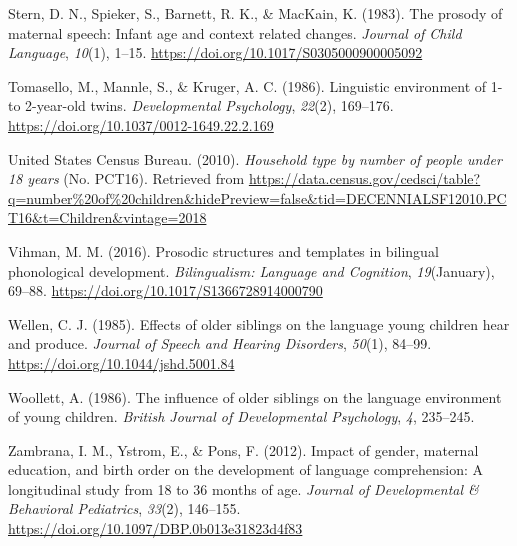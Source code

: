 \documentclass[man,floatsintext]{apa6}
\begin{document}
\leavevmode\hypertarget{ref-stern_prosody_1983}{}%
Stern, D. N., Spieker, S., Barnett, R. K., \& MacKain, K. (1983). The prosody of maternal speech: Infant age and context related changes. \emph{Journal of Child Language}, \emph{10}(1), 1--15. \url{https://doi.org/10.1017/S0305000900005092}

\leavevmode\hypertarget{ref-tomasello_linguistic_1986}{}%
Tomasello, M., Mannle, S., \& Kruger, A. C. (1986). Linguistic environment of 1- to 2-year-old twins. \emph{Developmental Psychology}, \emph{22}(2), 169--176. \url{https://doi.org/10.1037/0012-1649.22.2.169}

\leavevmode\hypertarget{ref-united_states_census_bureau_household_2010}{}%
United States Census Bureau. (2010). \emph{Household type by number of people under 18 years} (No. PCT16). Retrieved from \url{https://data.census.gov/cedsci/table?q=number\%20of\%20children\&hidePreview=false\&tid=DECENNIALSF12010.PCT16\&t=Children\&vintage=2018}

\leavevmode\hypertarget{ref-vihman_prosodic_2016}{}%
Vihman, M. M. (2016). Prosodic structures and templates in bilingual phonological development. \emph{Bilingualism: Language and Cognition}, \emph{19}(January), 69--88. \url{https://doi.org/10.1017/S1366728914000790}

\leavevmode\hypertarget{ref-wellen_effects_1985}{}%
Wellen, C. J. (1985). Effects of older siblings on the language young children hear and produce. \emph{Journal of Speech and Hearing Disorders}, \emph{50}(1), 84--99. \url{https://doi.org/10.1044/jshd.5001.84}

\leavevmode\hypertarget{ref-woollett_influence_1986}{}%
Woollett, A. (1986). The influence of older siblings on the language environment of young children. \emph{British Journal of Developmental Psychology}, \emph{4}, 235--245.

\leavevmode\hypertarget{ref-zambrana_impact_2012}{}%
Zambrana, I. M., Ystrom, E., \& Pons, F. (2012). Impact of gender, maternal education, and birth order on the development of language comprehension: A longitudinal study from 18 to 36 months of age. \emph{Journal of Developmental \& Behavioral Pediatrics}, \emph{33}(2), 146--155. \url{https://doi.org/10.1097/DBP.0b013e31823d4f83}

\endgroup
\end{document}
